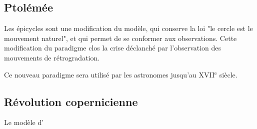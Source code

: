 
  \subsection{Ptolémée}

Les épicycles sont une modification du modèle, qui conserve la loi "le cercle est le mouvement naturel", et qui permet de se conformer aux observations. Cette modification du paradigme clos la crise déclanché par l'observation des mouvements de rétrogradation.



Ce nouveau paradigme sera utilisé par les astronomes jusqu'au {\footnotesize XVII}$^\text{e}$ siècle.

  \subsection{Révolution copernicienne}

Le modèle d' 







